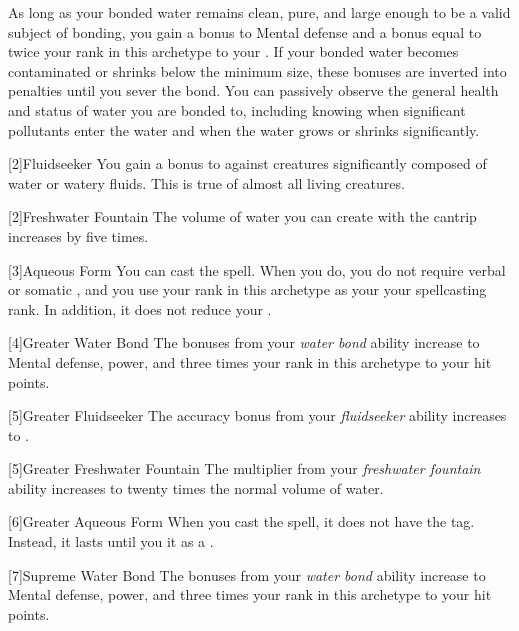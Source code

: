             As long as your bonded water remains clean, pure, and large enough to be a valid subject of bonding, you gain a  bonus to Mental defense and a bonus equal to twice your rank in this archetype to your .
            If your bonded water becomes contaminated or shrinks below the minimum size, these bonuses are inverted into penalties until you sever the bond.
            You can passively observe the general health and status of water you are bonded to, including knowing when significant pollutants enter the water and when the water grows or shrinks significantly.

            [2]{Fluidseeker} You gain a  bonus to  against creatures significantly composed of water or watery fluids.
            This is true of almost all living creatures.

            [2]{Freshwater Fountain} The volume of water you can create with the  cantrip increases by five times.

            [3]{Aqueous Form} You can cast the  spell.
            When you do, you do not require verbal or somatic , and you use your rank in this archetype as your your spellcasting rank.
            In addition, it does not reduce your .

            [4]{Greater Water Bond} The bonuses from your \textit{water bond} ability increase to  Mental defense,  power, and three times your rank in this archetype to your hit points.

            [5]{Greater Fluidseeker} The accuracy bonus from your \textit{fluidseeker} ability increases to .

            [5]{Greater Freshwater Fountain} The multiplier from your \textit{freshwater fountain} ability increases to twenty times the normal volume of water.

            [6]{Greater Aqueous Form} When you cast the  spell, it does not have the  tag.
            Instead, it lasts until you  it as a .

            [7]{Supreme Water Bond} The bonuses from your \textit{water bond} ability increase to  Mental defense,  power, and three times your rank in this archetype to your hit points.

